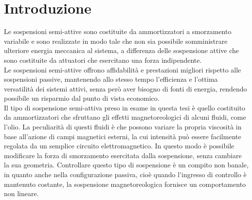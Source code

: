 \chapter{Introduzione}
\label{cha:intro}

Le sospensioni semi-attive sono costituite da ammortizzatori a smorzamento variabile e sono realizzate in modo tale che non sia possibile somministrare ulteriore energia meccanica al sistema, a differenza delle sospensione attive che sono costituite da attuatori che esercitano  una forza indipendente.\\
Le sospensioni semi-attive offrono affidabilità e prestazioni migliori rispetto alle sospensioni passive, mantenendo allo stesso tempo l'efficienza e l'ottima versatilità dei sistemi attivi, senza però aver bisogno di fonti di energia, rendendo possibile un risparmio dal punto di vista economico.\\

Il tipo di sospensione semi-attiva preso in esame in questa tesi è quello costituito da ammortizzatori che sfruttano gli effetti magnetoreologici di alcuni fluidi, come l'olio. La peculiarità di questi fluidi è che possono variare la propria viscosità in base all'azione di campi magnetici esterni, la cui intensità può essere facilmente regolata da un semplice circuito elettromagnetico. In questo modo è possibile modificare la forza di smorzamento esercitata dalla sospensione, senza cambiare la sua geometria. Controllare questo tipo di sospensione è un compito non banale, in quanto anche nella configurazione passiva, cioè quando l'ingresso di controllo è mantenuto costante, la sospensione magnetoreologica fornisce un comportamento non lineare.\\


